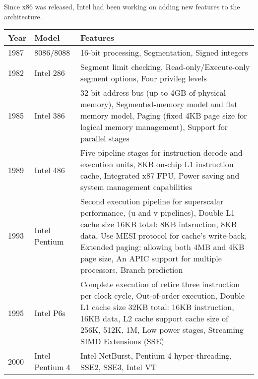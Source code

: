 \documentclass[letterpaper,10pt,titlepage]{article}
\begin{document}
\par
Since x86 was released, Intel had been working on adding new features to the
architecture. 
\begin{center}
   \begin{longtable}{l l p{10cm}}
      \textbf{Year} & \textbf{Model}      & \textbf{Features}\\ \hline

      1987 & 8086/8088  & 16-bit processing, Segmentation, Signed integers \\ 
      \hline
      1982 & Intel 286  & Segment limit checking, Read-only/Execute-only 
      			  segment options, Four privileg levels \\
      \hline
      1985 & Intel 386  & 32-bit address bus (up to 4GB of physical memory),
      			  \newline
      			  Segmented-memory model and flat memory model,
			  \newline
			  Paging (fixed 4KB page size for logical
			  memory management), 
			  \newline
			  Support for parallel stages \\
      \hline
      1989 & Intel 486  & Five pipeline stages for instruction decode and
      			  execution units, 
			  \newline
			  8KB on-chip L1 instruction cache, 
			  \newline
			  Integrated x87 FPU,
		          \newline
			  Power saving and system management capabilities\\
      \hline
      1993 & Intel Pentium & Second execution pipeline for superscalar performance,
      			  \newline
      			  (u and v pipelines),
			  \newline
			  Double L1 cache size 16KB total: 8KB intsruction, 
			  8KB data,
			  \newline
			  Use MESI protocol for cache's write-back,
			  \newline
			  Extended paging: allowing both 4MB and 4KB page size,
			  \newline
			  An APIC support for multiple processors,
			  \newline
			  Branch prediction\\
     \hline
     1995\newline-1999 & Intel P6s & Complete execution of retire three instruction 
     			  per clock cycle, 
			  \newline
			  Out-of-order execution,
			  \newline
			  Double L1 cache size 32KB total: 16KB instruction, 
			  16KB data,
			  \newline
			  L2 cache support cache size of 256K, 512K, 1M,
			  \newline
			  Low power stages,
			  Streaming SIMD Extensions (SSE)\\
     \hline
     2000\newline-2006 & Intel Pentium 4 & Intel NetBurst,
			  Pentium 4 hyper-threading,
			  SSE2, SSE3, Intel VT \\
     \hline
   \end{longtable}
\end{center}
\end{document}
